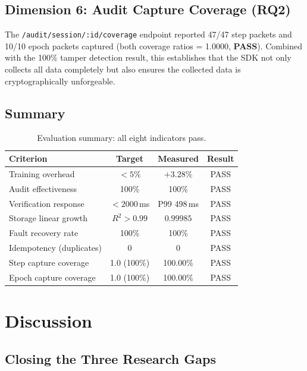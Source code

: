 \documentclass[10pt,twocolumn]{article}
\begin{document}
\subsection{Dimension 6: Audit Capture Coverage (RQ2)}

The \texttt{/audit/session/:id/coverage} endpoint reported 47/47 step packets and 10/10
epoch packets captured (both coverage ratios = 1.0000, \textbf{PASS}). Combined with
the 100\% tamper detection result, this establishes that the SDK not only collects all
data completely but also ensures the collected data is cryptographically unforgeable.

\subsection{Summary}

\begin{table}[ht]
  \centering
  \caption{Evaluation summary: all eight indicators pass.}
  \label{tab:summary}
  \small
  \begin{tabular}{lccc}
    \toprule
    Criterion & Target & Measured & Result \\
    \midrule
    Training overhead        & $< 5\%$       & $+3.28\%$       & PASS \\
    Audit effectiveness      & 100\%         & 100\%           & PASS \\
    Verification response    & $< 2000$\,ms  & P99 498\,ms     & PASS \\
    Storage linear growth    & $R^2 > 0.99$  & $0.99985$       & PASS \\
    Fault recovery rate      & 100\%         & 100\%           & PASS \\
    Idempotency (duplicates) & 0             & 0               & PASS \\
    Step capture coverage    & 1.0 (100\%)   & 100.00\%        & PASS \\
    Epoch capture coverage   & 1.0 (100\%)   & 100.00\%        & PASS \\
    \bottomrule
  \end{tabular}
\end{table}

\section{Discussion}

\subsection{Closing the Three Research Gaps}
\end{document}
